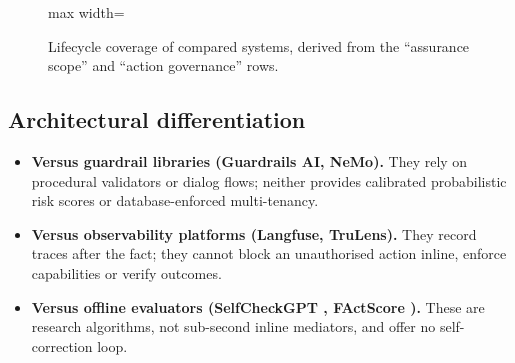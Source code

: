 \documentclass[11pt,a4paper]{article}
\newcommand{\dotp}[2]{\fill[primarynavy] (#1,#2) circle (0.14);}
\newcommand{\dotr}[2]{\draw[primarynavy,line width=0.8pt,fill=white] (#1,#2) circle (0.14);}
\begin{document}
\begin{figure}[!htbp]
\centering
\begin{adjustbox}{max width=\linewidth}
\end{adjustbox}
\caption{Lifecycle coverage of compared systems, derived from the ``assurance scope'' and ``action governance'' rows.}
\label{fig:coverage}
\end{figure}

\subsection{Architectural differentiation}
\begin{itemize}[leftmargin=*,itemsep=2pt]
  \item \textbf{Versus guardrail libraries (Guardrails AI, NeMo).} They rely on procedural validators or dialog flows; neither provides calibrated probabilistic risk scores or database-enforced multi-tenancy.
  \item \textbf{Versus observability platforms (Langfuse, TruLens).} They record traces after the fact; they cannot block an unauthorised action inline, enforce capabilities or verify outcomes.
  \item \textbf{Versus offline evaluators (SelfCheckGPT \cite{manakul2023}, FActScore \cite{min2023}).} These are research algorithms, not sub-second inline mediators, and offer no self-correction loop.
\end{itemize}
\end{document}
